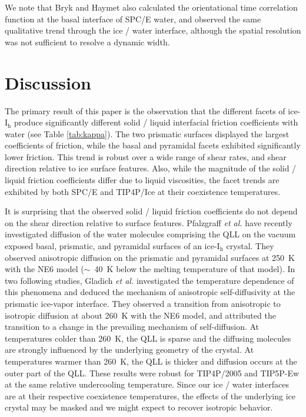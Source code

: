 We note that Bryk and Haymet also calculated the orientational time
correlation function at the basal interface of SPC/E
water,\cite{Bryk2002} and observed the same qualitative trend through
the ice / water interface, although the spatial resolution was not
sufficient to resolve a dynamic width.
 
\section{Discussion}
The primary result of this paper is the observation that the different
facets of ice-I$_\mathrm{h}$ produce significantly different solid /
liquid interfacial friction coefficients with water (see Table
\ref{tab:kappa}).  The two prismatic surfaces displayed the largest
coefficients of friction, while the basal and pyramidal facets
exhibited significantly lower friction. This trend is robust over a
wide range of shear rates, and shear direction relative to ice surface
features. Also, while the magnitude of the solid / liquid friction
coefficients differ due to liquid viscosities, the facet trends are
exhibited by both SPC/E and TIP4P/Ice at their coexistence
temperatures.

It is surprising that the observed solid / liquid friction
coefficients do not depend on the shear direction relative to surface
features. Pfalzgraff \textit{et al.} have recently investigated
diffusion of the water molecules comprising the QLL on the vacuum
exposed basal, prismatic, and pyramidal surfaces of an
ice-I$_\mathrm{h}$ crystal.\cite{Pfalzgraff2011} They observed
anisotropic diffusion on the prismatic and pyramidal surfaces at 250~K
with the NE6 model ($\sim$~40~K below the melting temperature of that
model). In two following studies, Gladich \textit{et al.}
investigated the temperature dependence of this phenomena and deduced
the mechanism of anisotropic self-diffusivity at the prismatic
ice-vapor interface.\cite{Gladich2011,Gladich2015} They observed a
transition from anisotropic to isotropic diffusion at about 260~K with
the NE6 model, and attributed the transition to a change in the
prevailing mechanism of self-diffusion. At temperatures colder than
260~K, the QLL is sparse and the diffusing molecules are strongly
influenced by the underlying geometry of the crystal. At temperatures
warmer than 260~K, the QLL is thicker and diffusion occurs at the
outer part of the QLL. These results were robust for TIP4P/2005 and
TIP5P-Ew at the same relative undercooling temperature. Since our ice
/ water interfaces are at their respective coexistence temperatures,
the effects of the underlying ice crystal may be masked and we might
expect to recover isotropic behavior.

